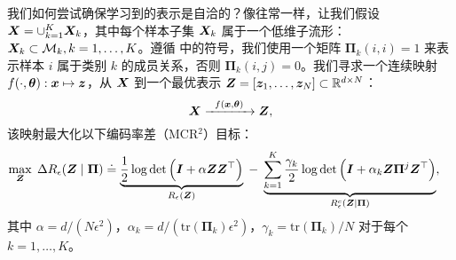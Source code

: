 \documentclass[../../book-main_zh.tex]{subfiles}
\begin{document}

我们如何尝试确保学习到的表示是自洽的？像往常一样，让我们假设 $\bm{X} = \cup_{k=1}^K \bm{X}_k$，其中每个样本子集 $\bm{X}_k$ 属于一个低维子流形：$\bm{X}_k \subset \mathcal{M}_k, k = 1,\ldots, K$。遵循  中的符号，我们使用一个矩阵 $\bm \Pi_k(i,i) = 1$ 来表示样本 $i$ 属于类别 $k$ 的成员关系，否则 $\bm \Pi_k(i,j) = 0$。我们寻求一个连续映射 $f(\cdot,\bm \theta): \bm{x} \mapsto \bm{z}$，从 $\bm{X}$ 到一个最优表示 $\bm{Z} = [\bm{z}_1, \ldots, \bm{z}_N] \subset \mathbb{R}^{d \times N}$：
\begin{equation}
\bm X  \xrightarrow{\hspace{2mm} f(\bm{x}, \bm \theta) \hspace{2mm}} \bm Z, 
\label{eqn:LDR}
\end{equation}
该映射最大化以下编码率差（MCR$^2$）目标：
\begin{equation}\label{eq:mcr2-formulation}
\begin{split}
\max_{\Z} \; \Delta R_\epsilon(\Z  \mid \bm{\Pi}) %
&\doteq \underbrace{\frac{1}{2}\log\det \Big(\I + {\alpha} \Z \Z^\top \Big)}_{R_{\epsilon}(\Z)} \;-\; \underbrace{\sum_{k=1}^{K}\frac{\gamma_k}{2} \log\det\Big(\I + {\alpha_k} \Z \bm{\Pi}^{j} \Z^\top \Big)}_{R^c_{\epsilon}(\Z \mid \bm \Pi)},
\end{split}
\end{equation}
其中 $\alpha = {d}/({N\epsilon^2})$，$\alpha_k = d/({\mathrm{tr}(\bm{\Pi}_k)\epsilon^2})$，$\gamma_k =  {\mathrm{tr}(\bm{\Pi}_{k})}/{N}$ 对于每个 $k = 1,\dots, K$。
\end{document}
